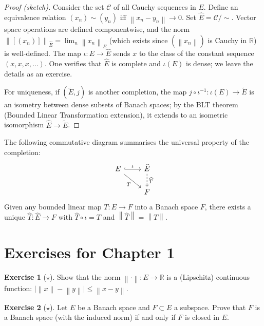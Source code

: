 \documentclass[a4paper,12pt]{book}
\newcommand{\R}{\mathbb{R}}
\newcommand{\norm}[1]{\left\| #1 \right\|}
\theoremstyle{definition}
\newtheorem{exercise}{Exercise}[chapter]
\theoremstyle{plain}
\theoremstyle{remark}
\begin{document}
\begin{proof}[Proof (sketch)]
Consider the set $\mathcal{C}$ of all Cauchy sequences in $E$.  Define an
equivalence relation $(x_n)\sim(y_n)$ iff $\norm{x_n-y_n}\to 0$.
Set $\widehat{E}=\mathcal{C}/{\sim}$.  Vector space operations are
defined componentwise, and the norm
$\norm{[(x_n)]}_{\widehat{E}}=\lim_n\norm{x_n}_E$ (which exists since
$(\norm{x_n})$ is Cauchy in $\R$) is well-defined.  The map
$\iota:E\to\widehat{E}$ sends $x$ to the class of the constant sequence
$(x,x,x,\dots)$.  One verifies that $\widehat{E}$ is complete and
$\iota(E)$ is dense; we leave the details as an exercise.

For uniqueness, if $(\widetilde{E},j)$ is another completion, the map
$j\circ\iota^{-1}:\iota(E)\to\widetilde{E}$ is an isometry between dense
subsets of Banach spaces; by the BLT theorem
(Bounded Linear Transformation extension), it extends to an isometric
isomorphism $\widehat{E}\to\widetilde{E}$.
\end{proof}

The following commutative diagram summarises the universal property of
the completion:
\[
\begin{tikzcd}
  E \arrow[r,"\iota",hook] \arrow[dr,"T"'] & \widehat{E} \arrow[d,dashed,"\widehat{T}"] \\
  & F
\end{tikzcd}
\]
Given any bounded linear map $T:E\to F$ into a Banach space $F$, there
exists a unique $\widehat{T}:\widehat{E}\to F$ with
$\widehat{T}\circ\iota=T$ and $\norm{\widehat{T}}=\norm{T}$.

\section{Exercises for Chapter 1}
\label{sec:ex-ch1}

\begin{exercise}[$\star$]
\label{exo:norm-continuous}
Show that the norm $\norm{\cdot}:E\to\R$ is a (Lipschitz) continuous
function: $\bigl|\norm{x}-\norm{y}\bigr|\le\norm{x-y}$.
\end{exercise}

\begin{exercise}[$\star$]
\label{exo:closed-subspace-banach}
Let $E$ be a Banach space and $F\subset E$ a subspace.  Prove that $F$ is
a Banach space (with the induced norm) if and only if $F$ is closed in $E$.
\end{exercise}
\end{document}
